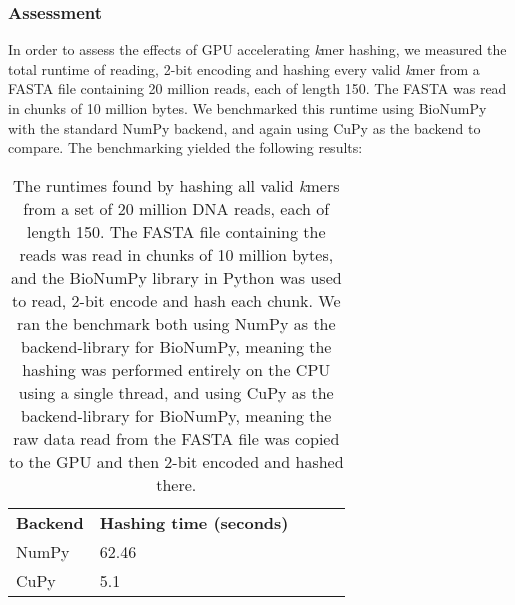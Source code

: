 \subsubsection{Assessment}
In order to assess the effects of GPU accelerating \textit{k}mer hashing, we measured the total runtime of reading, 2-bit encoding and hashing every valid \textit{k}mer from a FASTA file containing 20 million reads, each of length 150.
The FASTA was read in chunks of 10 million bytes.
We benchmarked this runtime using BioNumPy with the standard NumPy backend, and again using CuPy as the backend to compare.
The benchmarking yielded the following results:
\begin{table}[H]
\begin{center}
\begin{tabular}{lllll}
\multicolumn{1}{l|}{\textbf{Backend}} & \multicolumn{1}{l}{\textbf{Hashing time (seconds)}} &  \\ \cline{1-2}
\multicolumn{1}{l|}{NumPy} & \multicolumn{1}{l}{62.46} &  \\
\multicolumn{1}{l|}{CuPy} & \multicolumn{1}{l}{5.1} &  \\
\end{tabular}
\end{center}
\caption{
  The runtimes found by hashing all valid \textit{k}mers from a set of 20 million DNA reads, each of length 150.
  The FASTA file containing the reads was read in chunks of 10 million bytes, and the BioNumPy library in Python was used to read, 2-bit encode and hash each chunk.
  We ran the benchmark both using NumPy as the backend-library for BioNumPy, meaning the hashing was performed entirely on the CPU using a single thread, and using CuPy as the backend-library for BioNumPy, meaning the raw data read from the FASTA file was copied to the GPU and then 2-bit encoded and hashed there.
}
\label{methods:gpu_accelerating_kmer_hashing:tables:benchmark}
\end{table}

